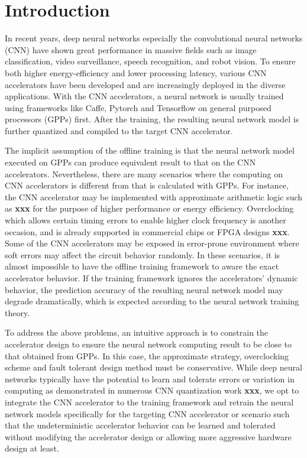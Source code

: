 \section{Introduction} \label{sec:intro}
In recent years, deep neural networks especially the convolutional neural networks (CNN) 
have shown great performance in massive fields such as image classification, 
video surveillance, speech recognition, and robot vision. To ensure both 
higher energy-efficiency and lower processing latency, various CNN accelerators 
\cite{pipecnn_2,Zhang2015_9,Qiu2016_10,deepburing_12,Farabet2010_13,Zeng2018_18} 
have been developed and are increasingly deployed in the diverse applications. 
With the CNN accelerators, a neural network is usually trained 
using frameworks like Caffe, Pytorch and Tensorflow on general purposed 
processors (GPPs) first. After the training, the resulting neural network 
model is further quantized and compiled to the target CNN accelerator. 

The implicit assumption of the offline training is that the neural 
network model executed on GPPs can produce equivalent result to 
that on the CNN accelerators. Nevertheless, there are 
many scenarios where the computing on CNN accelerators 
is different from that is calculated with GPPs. For instance, the 
CNN accelerator may be implemented with approximate arithmetic logic 
such as \textbf{xxx} for the purpose of higher performance or energy efficiency. 
Overclocking  \cite{overclock_3,Razor_15} which allows certain 
timing errors to enable higher clock frequency
is another occasion, and is already supported in commercial chips 
or FPGA designs \textbf{xxx}. Some of the CNN accelerators may be 
exposed in error-prone environment where soft errors 
may affect the circuit behavior randomly. 
In these scenarios, it is almost impossible to have the offline training 
framework to aware the exact accelerator behavior. 
If the training framework ignores the accelerators’ dynamic 
behavior, the prediction accuracy of the resulting neural 
network model may degrade dramatically, which is expected according to 
the neural network training theory.

To address the above problems, an intuitive approach is to 
constrain the accelerator design to ensure the neural 
network computing result to be close to that obtained from GPPs. 
In this case, the approximate strategy, overclocking scheme and 
fault tolerant design method must be conservative. 
While deep neural networks typically have the potential to 
learn and tolerate errors or variation in computing as demonstrated in 
numerous CNN quantization work \textbf{xxx}, we opt to 
integrate the CNN accelerator to the training framework 
and retrain the neural network models specifically for the 
targeting CNN accelerator or scenario such that the undeterministic 
accelerator behavior can be learned and tolerated without 
modifying the accelerator design or allowing more aggressive 
hardware design at least. 


